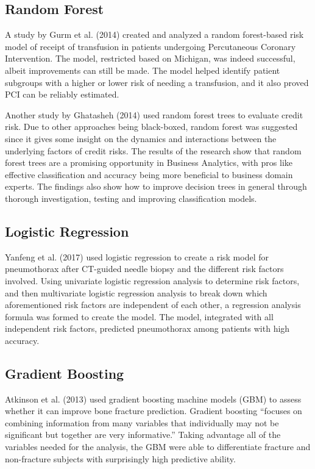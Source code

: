 \documentclass[10pt,11pt,12pt,oneside]{book}
\begin{document}
        \subsection{Random Forest}
        A study by Gurm et al. (2014) created and analyzed a random forest-based risk model of receipt of transfusion in patients undergoing Percutaneous Coronary Intervention. The model, restricted based on Michigan, was indeed successful, albeit improvements can still be made. The model helped identify patient subgroups with a higher or lower risk of needing a transfusion, and it also proved PCI can be reliably estimated. \cite{Gurm2014}
        
        Another study by Ghatasheh (2014) used random forest trees to evaluate credit risk. Due to other approaches being black-boxed, random forest was suggested since it gives some insight on the dynamics and interactions between the underlying factors of credit risks. The results of the research show that random forest trees are a promising opportunity in Business Analytics, with pros like effective classification and accuracy being more beneficial to business domain experts. The findings also show how to improve decision trees in general through thorough investigation, testing and improving classification models. \cite{Ghatasheh2014BusinessAU}
        \subsection{Logistic Regression}
        Yanfeng et al. (2017) used logistic regression to create a risk model for pneumothorax after CT-guided needle biopsy and the different risk factors involved. Using univariate logistic regression analysis to determine risk factors, and then multivariate logistic regression analysis to break down which aforementioned risk factors are independent of each other, a regression analysis formula was formed to create the model. The model, integrated with all independent risk factors, predicted pneumothorax among patients with high accuracy. \cite{Zhao2017}
        \subsection{Gradient Boosting}
        Atkinson et al. (2013) used gradient boosting machine models (GBM) to assess whether it can improve bone fracture prediction. Gradient boosting “focuses on combining information from many variables that individually may not be significant but together are very informative.” Taking advantage all of the variables needed for the analysis, the GBM were able to differentiate fracture and non-fracture subjects with surprisingly high predictive ability. 
        
\end{document}
